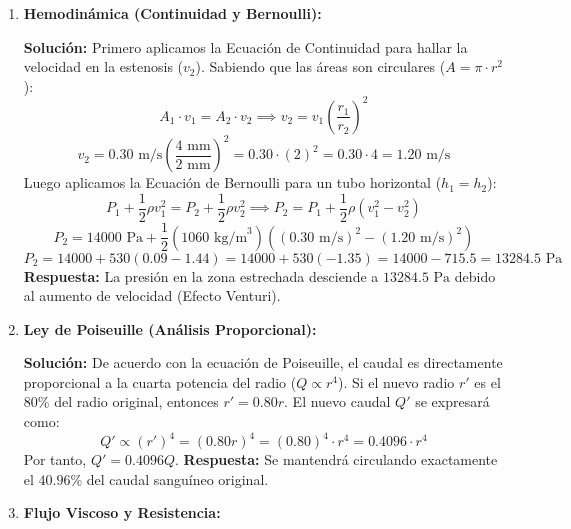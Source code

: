 \documentclass[12pt,letterpaper]{article}
\begin{document}
\begin{enumerate}
    \textbf{Respuesta:} El volumen de la muestra es de aproximadamente $2.45 \times 10^{-4} \text{ m}^3$ y su densidad real es $1875 \text{ kg/m}^3$.

    \vspace{0.5cm}
    \item \textbf{Hemodinámica (Continuidad y Bernoulli):}
    
    \textbf{Solución:}
    Primero aplicamos la Ecuación de Continuidad para hallar la velocidad en la estenosis ($v_2$). Sabiendo que las áreas son circulares ($A = \pi \cdot r^2$):
    \[
    A_1 \cdot v_1 = A_2 \cdot v_2 \implies v_2 = v_1 \left( \frac{r_1}{r_2} \right)^2
    \]
    \[
    v_2 = 0.30 \text{ m/s} \left( \frac{4 \text{ mm}}{2 \text{ mm}} \right)^2 = 0.30 \cdot (2)^2 = 0.30 \cdot 4 = 1.20 \text{ m/s}
    \]
    Luego aplicamos la Ecuación de Bernoulli para un tubo horizontal ($h_1 = h_2$):
    \[
    P_1 + \frac{1}{2}\rho v_1^2 = P_2 + \frac{1}{2}\rho v_2^2 \implies P_2 = P_1 + \frac{1}{2}\rho \left( v_1^2 - v_2^2 \right)
    \]
    \[
    P_2 = 14000 \text{ Pa} + \frac{1}{2}(1060 \text{ kg/m}^3) \left( (0.30 \text{ m/s})^2 - (1.20 \text{ m/s})^2 \right)
    \]
    \[
    P_2 = 14000 + 530 (0.09 - 1.44) = 14000 + 530 (-1.35) = 14000 - 715.5 = 13284.5 \text{ Pa}
    \]
    \textbf{Respuesta:} La presión en la zona estrechada desciende a $13284.5 \text{ Pa}$ debido al aumento de velocidad (Efecto Venturi).

    \vspace{0.5cm}
    \item \textbf{Ley de Poiseuille (Análisis Proporcional):}
    
    \textbf{Solución:}
    De acuerdo con la ecuación de Poiseuille, el caudal es directamente proporcional a la cuarta potencia del radio ($Q \propto r^4$). 
    Si el nuevo radio $r'$ es el $80\%$ del radio original, entonces $r' = 0.80 r$.
    El nuevo caudal $Q'$ se expresará como:
    \[
    Q' \propto (r')^4 = (0.80 r)^4 = (0.80)^4 \cdot r^4 = 0.4096 \cdot r^4
    \]
    Por tanto, $Q' = 0.4096 Q$.
    \textbf{Respuesta:} Se mantendrá circulando exactamente el $40.96\%$ del caudal sanguíneo original.

    \vspace{0.5cm}
    \item \textbf{Flujo Viscoso y Resistencia:}
    

\end{enumerate}
\end{document}
